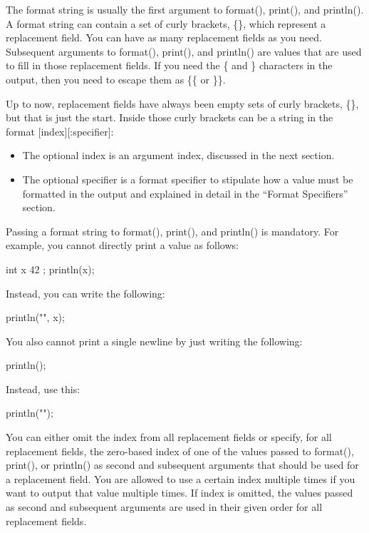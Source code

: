 The format string is usually the first argument to format(), print(), and println(). A format string can contain a set of curly brackets, \{\}, which represent a replacement field. You can have as many replacement fields as you need. Subsequent arguments to format(), print(), and println() are values that are used to fill in those replacement fields. If you need the \{ and \} characters in the output, then you need to escape them as \{\{ or \}\}.

Up to now, replacement fields have always been empty sets of curly brackets, \{\}, but that is just the start. Inside those curly brackets can be a string in the format [index][:specifier]:

\begin{itemize}
\item
The optional index is an argument index, discussed in the next section.

\item
The optional specifier is a format specifier to stipulate how a value must be formatted in the output and explained in detail in the “Format Specifiers” section.
\end{itemize}

Passing a format string to format(), print(), and println() is mandatory. For example, you cannot directly print a value as follows:

\begin{cpp}
int x { 42 };
println(x);
\end{cpp}

Instead, you can write the following:

\begin{cpp}
println("{}", x);
\end{cpp}

You also cannot print a single newline by just writing the following:

\begin{cpp}
println();
\end{cpp}

Instead, use this:

\begin{cpp}
println("");
\end{cpp}


You can either omit the index from all replacement fields or specify, for all replacement fields, the zero-based index of one of the values passed to format(), print(), or println() as second and subsequent arguments that should be used for a replacement field. You are allowed to use a certain index multiple times if you want to output that value multiple times. If index is omitted, the values passed as second and subsequent arguments are used in their given order for all replacement fields.

